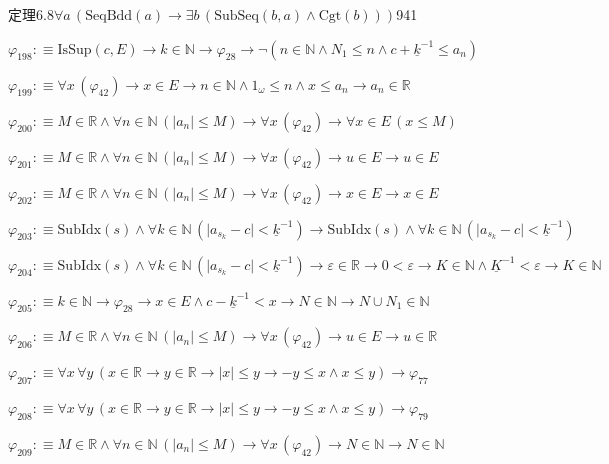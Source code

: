 \begin{fullproof}{定理6.8}{$\forall a\,(\mathrm{SeqBdd}(a) \to \exists b\,(\mathrm{SubSeq}(b,a) \land \mathrm{Cgt}(b)))$}{941}
\begin{abbrevlist}
\item $\varphi_{198} :\equiv \mathrm{IsSup}(c,E) \to k \in \mathbb{N} \to \varphi_{28} \to \neg (n \in \mathbb{N} \land N_{1} \leq n \land c + \underline{k}^{-1} \leq a_{n})$
\item $\varphi_{199} :\equiv \forall x\,(\varphi_{42}) \to x \in E \to n \in \mathbb{N} \land 1_{\omega} \leq n \land x \leq a_{n} \to a_{n} \in \mathbb{R}$
\item $\varphi_{200} :\equiv M \in \mathbb{R} \land \forall n \in \mathbb{N}\,(\lvert a_{n} \rvert \leq M) \to \forall x\,(\varphi_{42}) \to \forall x \in E\,(x \leq M)$
\item $\varphi_{201} :\equiv M \in \mathbb{R} \land \forall n \in \mathbb{N}\,(\lvert a_{n} \rvert \leq M) \to \forall x\,(\varphi_{42}) \to u \in E \to u \in E$
\item $\varphi_{202} :\equiv M \in \mathbb{R} \land \forall n \in \mathbb{N}\,(\lvert a_{n} \rvert \leq M) \to \forall x\,(\varphi_{42}) \to x \in E \to x \in E$
\item $\varphi_{203} :\equiv \mathrm{SubIdx}(s) \land \forall k \in \mathbb{N}\,(\lvert a_{s_{k}} - c \rvert < \underline{k}^{-1}) \to \mathrm{SubIdx}(s) \land \forall k \in \mathbb{N}\,(\lvert a_{s_{k}} - c \rvert < \underline{k}^{-1})$
\item $\varphi_{204} :\equiv \mathrm{SubIdx}(s) \land \forall k \in \mathbb{N}\,(\lvert a_{s_{k}} - c \rvert < \underline{k}^{-1}) \to \varepsilon \in \mathbb{R} \to 0 < \varepsilon \to K \in \mathbb{N} \land \underline{K}^{-1} < \varepsilon \to K \in \mathbb{N}$
\item $\varphi_{205} :\equiv k \in \mathbb{N} \to \varphi_{28} \to x \in E \land c - \underline{k}^{-1} < x \to N \in \mathbb{N} \to N \cup N_{1} \in \mathbb{N}$
\item $\varphi_{206} :\equiv M \in \mathbb{R} \land \forall n \in \mathbb{N}\,(\lvert a_{n} \rvert \leq M) \to \forall x\,(\varphi_{42}) \to u \in E \to u \in \mathbb{R}$
\item $\varphi_{207} :\equiv \forall x\,\forall y\,(x \in \mathbb{R} \to y \in \mathbb{R} \to \lvert x \rvert \leq y \to -y \leq x \land x \leq y) \to \varphi_{77}$
\item $\varphi_{208} :\equiv \forall x\,\forall y\,(x \in \mathbb{R} \to y \in \mathbb{R} \to \lvert x \rvert \leq y \to -y \leq x \land x \leq y) \to \varphi_{79}$
\item $\varphi_{209} :\equiv M \in \mathbb{R} \land \forall n \in \mathbb{N}\,(\lvert a_{n} \rvert \leq M) \to \forall x\,(\varphi_{42}) \to N \in \mathbb{N} \to N \in \mathbb{N}$

\end{abbrevlist}
\end{fullproof}
